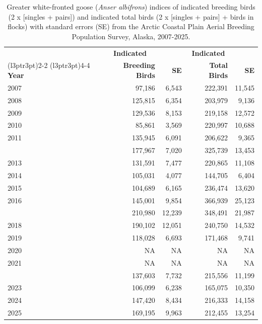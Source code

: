 \documentclass[
]{article}
\begin{document}
\begin{longtable}[t]{lrrrr}

\caption{\label{tbl-GWFG}Greater white-fronted goose (\emph{Anser
albifrons}) indices of indicated breeding birds (2 x {[}singles +
pairs{]}) and indicated total birds (2 x {[}singles + pairs{]} + birds
in flocks) with standard errors (SE) from the Arctic Coastal Plain
Aerial Breeding Population Survey, Alaska, 2007-2025.}

\tabularnewline

\\
\toprule
\multicolumn{1}{c}{\textbf{ }} & \multicolumn{1}{c}{\textbf{Indicated}} & \multicolumn{1}{c}{\textbf{ }} & \multicolumn{1}{c}{\textbf{Indicated}} & \multicolumn{1}{c}{\textbf{ }} \\
\cmidrule(l{3pt}r{3pt}){2-2} \cmidrule(l{3pt}r{3pt}){4-4}
\textbf{Year} & \textbf{Breeding Birds} & \textbf{SE} & \textbf{Total Birds} & \textbf{SE}\\
\midrule
2007 & 97,186 & 6,543 & 222,391 & 11,545\\
2008 & 125,815 & 6,354 & 203,979 & 9,136\\
2009 & 129,536 & 8,153 & 219,158 & 12,572\\
2010 & 85,861 & 3,569 & 220,997 & 10,688\\
2011 & 135,945 & 6,091 & 206,622 & 9,365\\
\addlinespace
2012 & 177,967 & 7,020 & 325,739 & 13,453\\
2013 & 131,591 & 7,477 & 220,865 & 11,108\\
2014 & 105,031 & 4,077 & 144,705 & 6,404\\
2015 & 104,689 & 6,165 & 236,474 & 13,620\\
2016 & 145,001 & 9,854 & 366,939 & 25,123\\
\addlinespace
2017 & 210,980 & 12,239 & 348,491 & 21,987\\
2018 & 190,102 & 12,051 & 240,750 & 14,532\\
2019 & 118,028 & 6,693 & 171,468 & 9,741\\
2020 & NA & NA & NA & NA\\
2021 & NA & NA & NA & NA\\
\addlinespace
2022 & 137,603 & 7,732 & 215,556 & 11,199\\
2023 & 106,099 & 6,238 & 165,075 & 10,350\\
2024 & 147,420 & 8,434 & 216,333 & 14,158\\
2025 & 169,195 & 9,963 & 212,455 & 13,254\\
\bottomrule

\end{longtable}
\end{document}
